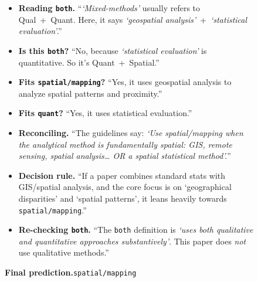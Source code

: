 \begin{figure}[t]
  \begin{tcbraster}[
    raster columns=2,
    raster equal height=rows,
    raster column skip=8pt,
    raster row skip=4pt,
  ]
  \begin{tcolorbox}[
    enhanced,
    colback=red!2,
    colframe=red!50!black!55,
    boxrule=0.4pt, arc=2pt,
    left=8pt, right=8pt, top=6pt, bottom=6pt,
    title={\textsc{v1 schema} (methods\_01.csv) --- 6 categories},
    fonttitle=\small\bfseries,
    fontupper=\small,
  ]
  \begin{itemize}\setlength\itemsep{2pt}
  \item \textbf{Reading \texttt{both}.} ``\emph{`Mixed-methods'} usually refers to Qual~+~Quant. Here, it says \emph{`geospatial analysis'}~+~\emph{`statistical evaluation'}.''
  \item \textbf{Is this \texttt{both}?} ``No, because \emph{`statistical evaluation'} is quantitative. So it's Quant~+~Spatial.''
  \item \textbf{Fits \texttt{spatial/mapping}?} ``Yes, it uses geospatial analysis to analyze spatial patterns and proximity.''
  \item \textbf{Fits \texttt{quant}?} ``Yes, it uses statistical evaluation.''
  \item \textbf{Reconciling.} ``The guidelines say: \emph{`Use spatial/mapping when the analytical method is fundamentally spatial: GIS, remote sensing, spatial analysis\dots{} OR a spatial statistical method'.}''
  \item \textbf{Decision rule.} ``If a paper combines standard stats with GIS/spatial analysis, and the core focus is on `geographical disparities' and `spatial patterns', it leans heavily towards \texttt{spatial/mapping}.''
  \item \textbf{Re-checking \texttt{both}.} ``The \texttt{both} definition is \emph{`uses both qualitative and quantitative approaches substantively'}. This paper does \emph{not} use qualitative methods.''
  \end{itemize}

  \medskip
  \textbf{Final prediction.}\quad\texttt{spatial/mapping}
  \end{tcolorbox}


\end{tcbraster}
\end{figure}
